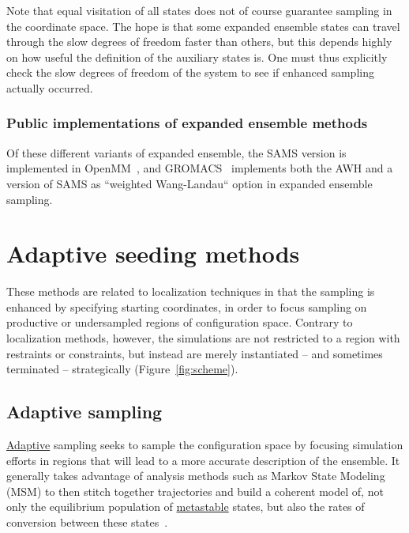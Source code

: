 \documentclass[9pt,review]{livecoms}
\begin{document}
Note that equal visitation of all states does not of course guarantee sampling in the coordinate space. The hope is that some expanded ensemble states can travel through the slow degrees of freedom faster than others, but this depends highly on how useful the definition of the auxiliary states is. One must thus explicitly check the slow degrees of freedom of the system to see if enhanced sampling actually occurred.

\subsubsection{Public implementations of expanded ensemble methods}

Of these different variants of expanded ensemble, the SAMS version is implemented in OpenMM~\cite{10.1371/journal.pcbi.1005659}, and GROMACS~\cite{lindahl_2021} implements both the AWH and a version of SAMS as ``weighted Wang-Landau`` option in expanded ensemble sampling.

\section{Adaptive seeding methods}
\label{sec:seeding}

These methods are related to localization techniques in that the sampling is enhanced by specifying starting coordinates, in order to focus sampling on productive or undersampled regions of configuration space. Contrary to localization methods, however, the simulations are not restricted to a region with restraints or constraints, but instead are merely instantiated -- and sometimes terminated -- strategically (Figure~\ref{fig:scheme}).


\subsection{Adaptive sampling}
\hyperlink{ref:Adaptive} {Adaptive} sampling seeks to sample the configuration space by focusing simulation efforts in regions that will lead to a more accurate description of the ensemble. It generally takes advantage of analysis methods such as Markov State Modeling (MSM) to then stitch together trajectories and build a coherent model of, not only the equilibrium population of \hyperlink{ref:metastab} {metastable} states, but also the rates of conversion between these states~\cite{10.1007/978-94-007-7606-7,10.1021/jacs.7b12191}.
\end{document}
